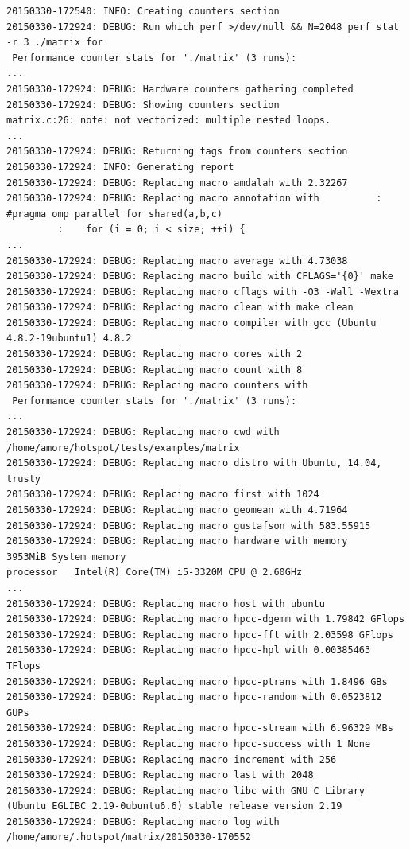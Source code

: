 \documentclass[a4paper]{report}
\begin{document}
\begin{lstlisting}[caption={Salida de Ejemplo},basicstyle=\tiny,label={lst:log}]
20150330-172540: INFO: Creating counters section
20150330-172924: DEBUG: Run which perf >/dev/null && N=2048 perf stat -r 3 ./matrix for 
 Performance counter stats for './matrix' (3 runs):
...
20150330-172924: DEBUG: Hardware counters gathering completed
20150330-172924: DEBUG: Showing counters section
matrix.c:26: note: not vectorized: multiple nested loops.
...
20150330-172924: DEBUG: Returning tags from counters section
20150330-172924: INFO: Generating report
20150330-172924: DEBUG: Replacing macro amdalah with 2.32267
20150330-172924: DEBUG: Replacing macro annotation with          :	#pragma omp parallel for shared(a,b,c) 
         :	  for (i = 0; i < size; ++i) {
...
20150330-172924: DEBUG: Replacing macro average with 4.73038
20150330-172924: DEBUG: Replacing macro build with CFLAGS='{0}' make
20150330-172924: DEBUG: Replacing macro cflags with -O3 -Wall -Wextra
20150330-172924: DEBUG: Replacing macro clean with make clean
20150330-172924: DEBUG: Replacing macro compiler with gcc (Ubuntu 4.8.2-19ubuntu1) 4.8.2
20150330-172924: DEBUG: Replacing macro cores with 2
20150330-172924: DEBUG: Replacing macro count with 8
20150330-172924: DEBUG: Replacing macro counters with 
 Performance counter stats for './matrix' (3 runs):
...
20150330-172924: DEBUG: Replacing macro cwd with /home/amore/hotspot/tests/examples/matrix
20150330-172924: DEBUG: Replacing macro distro with Ubuntu, 14.04, trusty
20150330-172924: DEBUG: Replacing macro first with 1024
20150330-172924: DEBUG: Replacing macro geomean with 4.71964
20150330-172924: DEBUG: Replacing macro gustafson with 583.55915
20150330-172924: DEBUG: Replacing macro hardware with memory      3953MiB System memory
processor   Intel(R) Core(TM) i5-3320M CPU @ 2.60GHz
...
20150330-172924: DEBUG: Replacing macro host with ubuntu
20150330-172924: DEBUG: Replacing macro hpcc-dgemm with 1.79842 GFlops
20150330-172924: DEBUG: Replacing macro hpcc-fft with 2.03598 GFlops
20150330-172924: DEBUG: Replacing macro hpcc-hpl with 0.00385463 TFlops
20150330-172924: DEBUG: Replacing macro hpcc-ptrans with 1.8496 GBs
20150330-172924: DEBUG: Replacing macro hpcc-random with 0.0523812 GUPs
20150330-172924: DEBUG: Replacing macro hpcc-stream with 6.96329 MBs
20150330-172924: DEBUG: Replacing macro hpcc-success with 1 None
20150330-172924: DEBUG: Replacing macro increment with 256
20150330-172924: DEBUG: Replacing macro last with 2048
20150330-172924: DEBUG: Replacing macro libc with GNU C Library (Ubuntu EGLIBC 2.19-0ubuntu6.6) stable release version 2.19
20150330-172924: DEBUG: Replacing macro log with /home/amore/.hotspot/matrix/20150330-170552

\end{lstlisting}
\end{document}
